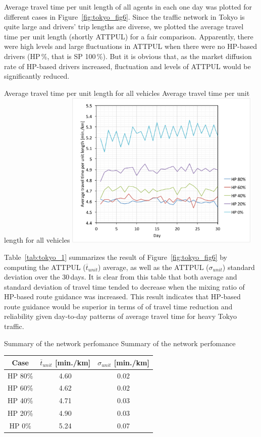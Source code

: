 Average travel time per unit length of all agents in each one day was plotted for different cases in Figure~\ref{fig:tokyo_fig6}. Since the traffic network in Tokyo is quite large and drivers' trip lengths are diverse, we plotted the average travel time per unit length (shortly ATTPUL) for a fair comparison. Apparently, there were high levels and large fluctuations in ATTPUL when there were no HP-based drivers (HP\,\%, that is SP 100\,\%). But it is obvious that, as the market diffusion rate of HP-based drivers increased, fluctuation and levels of ATTPUL  would be significantly reduced.


\createfigure%
{Average travel time per unit length for all vehicles}%
{Average travel time per unit length for all vehicles}%
{\label{fig:tokyo_fig6}}%
{\includegraphics[width=0.70\textwidth, angle=0]{./scenarios/figures/tokyo_fig6.pdf}}%
{}


Table~\ref{tab:tokyo_1} summarizes the result of Figure~\ref{fig:tokyo_fig6} by computing the ATTPUL ($\overline{t}_{unit}$) average, as well as the ATTPUL ($\sigma_{unit}$) standard deviation over the 30\,days. It is clear from this table that both average and standard deviation of travel time tended to decrease when the mixing ratio of HP-based route guidance was increased. This result indicates that HP-based route guidance would be superior in terms of of travel time reduction and reliability given day-to-day patterns of average travel time for  heavy Tokyo traffic. 

\createtable%
	{Summary of the network perfomance}%
	{Summary of the network perfomance}%
	{\label{tab:tokyo_1}}%
	{%
	\begin{tabular}{ccc}
	\hline
			Case & $\overline{t}_{unit}$ [min./km] & $\sigma_{unit}$ [min./km]\\
			\hline
			HP 80\%& 4.60& 0.02 \\
			HP 60\%& 4.62 & 0.02 \\
			HP 40\%& 4.71 & 0.03 \\
			HP 20\%& 4.90 & 0.03  \\
			HP 0\%& 5.24 & 0.07 \\
			\hline
\end{tabular}
}%
{}%

